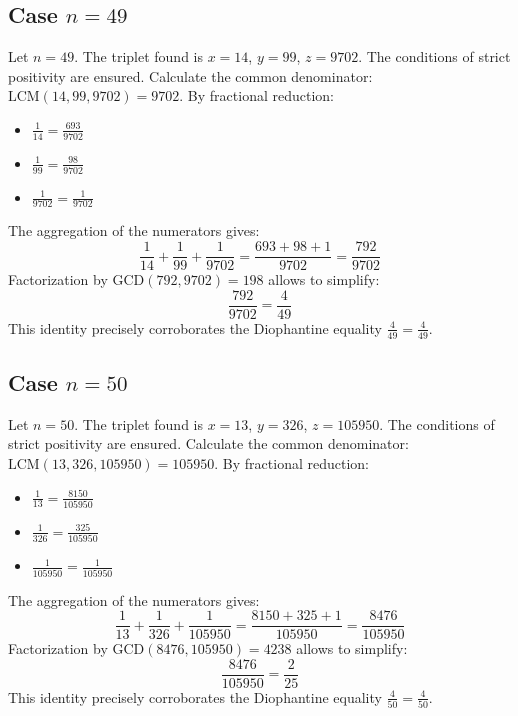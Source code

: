 \documentclass[11pt,a4paper]{article}
\begin{document}
\subsection{Case $n = 49$}
Let $n = 49$. The triplet found is $x = 14$, $y = 99$, $z = 9702$.
The conditions of strict positivity are ensured.
Calculate the common denominator: $\text{LCM}(14, 99, 9702) = 9702$.
By fractional reduction:
\begin{itemize}
    \item $\frac{1}{14} = \frac{693}{9702}$
    \item $\frac{1}{99} = \frac{98}{9702}$
    \item $\frac{1}{9702} = \frac{1}{9702}$
\end{itemize}
The aggregation of the numerators gives:
$$ \frac{1}{14} + \frac{1}{99} + \frac{1}{9702} = \frac{693 + 98 + 1}{9702} = \frac{792}{9702} $$
Factorization by $\text{GCD}(792, 9702) = 198$ allows to simplify:
$$ \frac{792}{9702} = \frac{4}{49} $$
This identity precisely corroborates the Diophantine equality $\frac{4}{49} = \frac{4}{49}$.

\subsection{Case $n = 50$}
Let $n = 50$. The triplet found is $x = 13$, $y = 326$, $z = 105950$.
The conditions of strict positivity are ensured.
Calculate the common denominator: $\text{LCM}(13, 326, 105950) = 105950$.
By fractional reduction:
\begin{itemize}
    \item $\frac{1}{13} = \frac{8150}{105950}$
    \item $\frac{1}{326} = \frac{325}{105950}$
    \item $\frac{1}{105950} = \frac{1}{105950}$
\end{itemize}
The aggregation of the numerators gives:
$$ \frac{1}{13} + \frac{1}{326} + \frac{1}{105950} = \frac{8150 + 325 + 1}{105950} = \frac{8476}{105950} $$
Factorization by $\text{GCD}(8476, 105950) = 4238$ allows to simplify:
$$ \frac{8476}{105950} = \frac{2}{25} $$
This identity precisely corroborates the Diophantine equality $\frac{4}{50} = \frac{4}{50}$.
\end{document}
